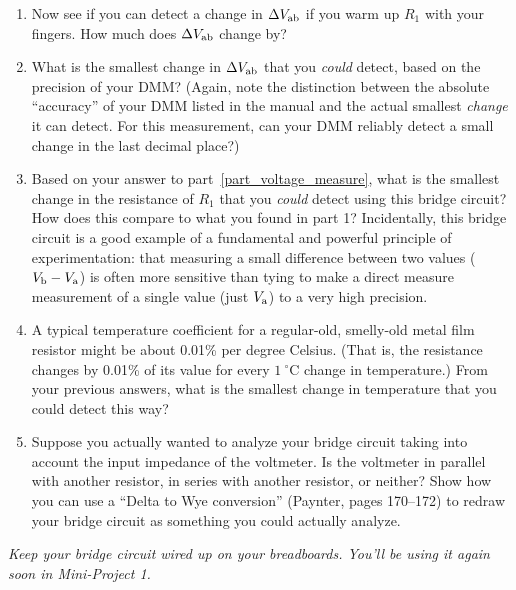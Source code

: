 \begin{enumerate}[wide]
\item Now see if you can detect a change in $\Delta V_{\rm ab}$ if you warm up $R_1$ with your fingers.  How much does $\Delta V_{\rm ab}$ change by?

\item What is the smallest change in $\Delta V_{\rm ab}$ that you \textit{could} detect, based on the precision of your DMM?  (Again, note the distinction between the absolute ``accuracy'' of your DMM listed in the manual and the actual smallest \textit{change} it can detect.  For this measurement, can your DMM reliably detect a small change in the last decimal place?) \label{part_voltage_measure}

\item Based on your answer to part~\ref{part_voltage_measure}, what is the smallest change in the resistance of $R_1$ that you \textit{could} detect using this bridge circuit?  How does this compare to what you found in part 1?  Incidentally, this bridge circuit is a good example of a fundamental and powerful principle of experimentation: that measuring a small difference between two values ($V_{\rm b} - V_{\rm a}$) is often more sensitive than tying to make a direct measure measurement of a single value (just $V_{\rm a}$) to a very high precision.

\item A typical temperature coefficient for a regular-old, smelly-old metal film resistor might be about 0.01\% per degree Celsius.  (That is, the resistance changes by 0.01\% of its value for every $1~^\circ$C change in temperature.)  From your previous answers, what is the smallest change in temperature that you could detect this way?

\item Suppose you actually wanted to analyze your bridge circuit taking into account the input impedance of the voltmeter.  Is the voltmeter in parallel with another resistor, in series with another resistor, or neither?  Show how you can use a ``Delta to Wye conversion'' (Paynter, pages 170--172) to redraw your bridge circuit as something you could actually analyze.

\end{enumerate}

\textit{Keep your bridge circuit wired up on your breadboards.  You'll be using it again soon in Mini-Project 1.}






